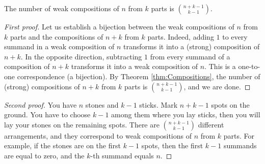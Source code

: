\begin{page}
\setcounter{section}{3}
\setcounter{subsection}{5}
\setcounter{dfn}{13}
\label{portion:119}

\begin{thm}
\label{thm:WeakComp}
The number of weak compositions of $n$ from $k$ parts is $\binom{n+k-1}{k-1}$.
\end{thm}

\end{page}

\begin{page}
\setcounter{section}{3}
\setcounter{subsection}{6}
\setcounter{dfn}{13}
\label{portion:120}

\begin{proof}[First proof]
Let us establish a bijection between the weak compositions of $n$ from $k$ parts and the compositions of $n+k$ from $k$ parts.
Indeed, adding $1$ to every summand in a weak composition of $n$ transforms it into a (strong) composition of $n+k$.
In the opposite direction, subtracting $1$ from every summand of a composition of $n+k$ transforms it into
a weak composition of $n$.
This is a one-to-one correspondence (a bijection).
By Theorem \ref{thm:Compositions}, the number of (strong) compositions of $n+k$ from $k$ parts is $\binom{n+k-1}{k-1}$, and we are done.
\end{proof}

\begin{proof}[Second proof]
You have $n$ stones and $k-1$ sticks.
Mark $n+k-1$ spots on the ground.
You have to choose $k-1$ among them where you lay sticks, then you will lay your stones on the remaining spots.
There are $\binom{n+k-1}{k-1}$ different arrangements, and they correspond to weak compositions of $n$ from $k$ parts.
For example, if the stones are on the first $k-1$ spots, then the first $k-1$ summands are equal to zero, and the $k$-th summand equals $n$.
\end{proof}



\end{page}

